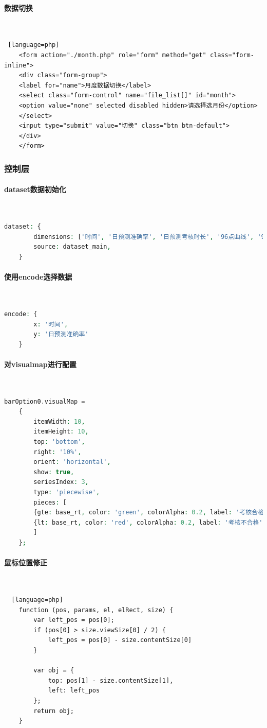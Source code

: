 \documentclass[winfonts,UTF8,a4paper]{ctexart}
\begin{document}
\paragraph*{数据切换}\ \\
\begin{lstlisting} [language=php]
	<form action="./month.php" role="form" method="get" class="form-inline">
	<div class="form-group">
	<label for="name">月度数据切换</label>
	<select class="form-control" name="file_list[]" id="month">
	<option value="none" selected disabled hidden>请选择选月份</option>
	</select>
	<input type="submit" value="切换" class="btn btn-default">
	</div>
	</form>
\end{lstlisting}
\subsubsection*{控制层}
\paragraph*{dataset数据初始化}\ \\
\begin{lstlisting}[language=php]
	dataset: {
		dimensions: ['时间', '日预测准确率', '日预测考核时长', '96点曲线', '96点曲线y轴最小值', '96点曲线y轴最大值', ' 实时考核准确率'],
		source: dataset_main,
	}
\end{lstlisting}
\paragraph*{使用encode选择数据}\ \\
\begin{lstlisting}[language=php]
	encode: {
		x: '时间',
		y: '日预测准确率'
	}
\end{lstlisting}
\paragraph*{对visualmap进行配置}\label{对visualmap进行配置}\ \\
\begin{lstlisting}[language=php]
	barOption0.visualMap =
	{
		itemWidth: 10,
		itemHeight: 10,
		top: 'bottom',
		right: '10%',
		orient: 'horizontal',
		show: true,
		seriesIndex: 3,
		type: 'piecewise',
		pieces: [
		{gte: base_rt, color: 'green', colorAlpha: 0.2, label: '考核合格'},
		{lt: base_rt, color: 'red', colorAlpha: 0.2, label: '考核不合格'},
		]
	};
\end{lstlisting}
\paragraph*{鼠标位置修正}\ \\
\begin{lstlisting}  [language=php]
	function (pos, params, el, elRect, size) {
		var left_pos = pos[0];
		if (pos[0] > size.viewSize[0] / 2) {
			left_pos = pos[0] - size.contentSize[0]
		}
		
		var obj = {
			top: pos[1] - size.contentSize[1],
			left: left_pos
		};
		return obj;
	}
\end{lstlisting}
\end{document}
